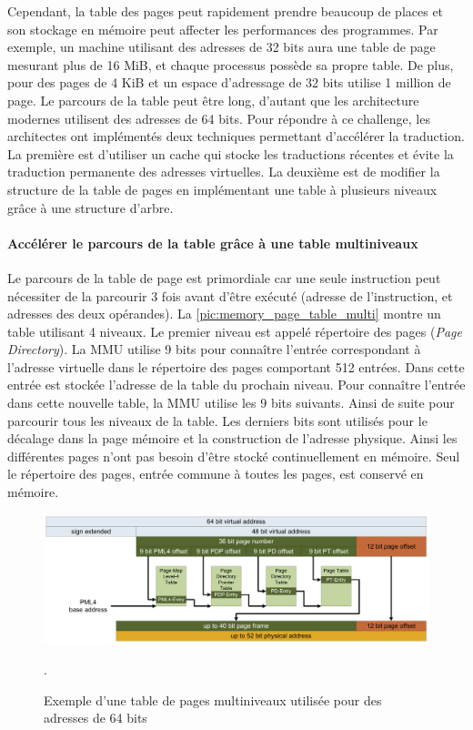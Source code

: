 Cependant, la table des pages peut rapidement prendre beaucoup de places et son stockage en mémoire peut affecter les performances des programmes. Par exemple, un machine utilisant des adresses de 32 bits aura une table de page mesurant plus de 16 MiB, et chaque processus possède sa propre table. De plus, pour des pages de 4 KiB et un espace d'adressage de 32 bits utilise 1 million de page. Le parcours de la table peut être long, d'autant que les architecture modernes utilisent des adresses de 64 bits. Pour répondre à ce challenge, les architectes ont implémentés deux techniques permettant d'accélérer la traduction. La première est d'utiliser un cache qui stocke les traductions récentes et évite la traduction permanente des adresses virtuelles. La deuxième est de modifier la structure de la table de pages en implémentant une table à plusieurs niveaux grâce à une structure d'arbre. 


\paragraph{Accélérer le parcours de la table grâce à une table multiniveaux} Le parcours de la table de page est primordiale car une seule instruction peut nécessiter de la parcourir 3 fois avant d'être exécuté (adresse de l'instruction, et adresses des deux opérandes). La \autoref{pic:memory_page_table_multi} montre un table utilisant 4 niveaux. Le premier niveau est appelé répertoire des pages (\textit{Page Directory}). La MMU utilise 9 bits pour connaître l'entrée correspondant à l'adresse virtuelle dans le répertoire des pages comportant 512 entrées. Dans cette entrée est stockée l'adresse de la table du  prochain niveau. Pour connaître l'entrée dans cette nouvelle table, la MMU utilise les 9 bits suivants. Ainsi de suite pour parcourir tous les niveaux de la table. Les derniers bits sont utilisés pour le décalage dans la page mémoire et la construction de l'adresse physique. Ainsi les différentes pages  n'ont pas besoin d'être stocké continuellement en mémoire. Seul le répertoire des pages, entrée commune à toutes les pages, est conservé en mémoire. 


\begin{figure}
    \center
    \includegraphics[width=14cm]{images/memory_page_table_multi.png}
    \caption{\label{pic:memory_page_table_multi} Exemple d'une table de pages multiniveaux utilisée pour des adresses de 64 bits \cite{Molka}}.
\end{figure}



